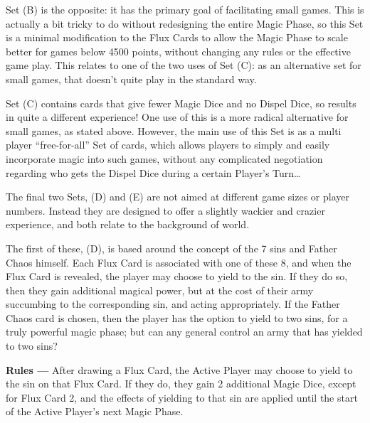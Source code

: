 
Set (B) is the opposite: it has the primary goal of facilitating small games. This is actually a bit tricky to do without redesigning the entire Magic Phase, so this Set is a minimal modification to the Flux Cards to allow the Magic Phase to scale better for games below 4500 points, without changing any rules or the effective game play. This relates to one of the two uses of Set (C): as an alternative set for small games, that doesn't quite play in the standard way.


Set (C) contains cards that give fewer Magic Dice and no Dispel Dice, so results in quite a different experience! One use of this is a more radical alternative for small games, as stated above. However, the main use of this Set is as a multi player \enquote{free-for-all} Set of cards, which allows players to simply and easily incorporate magic into such games, without any complicated negotiation regarding who gets the Dispel Dice during a certain Player's Turn\dots{}


The final two Sets, (D) and (E) are not aimed at different game sizes or player numbers. Instead they are designed to offer a slightly wackier and crazier experience, and both relate to the background of \theninthage{} world.

The first of these, (D), is based around the concept of the 7 sins and Father Chaos himself. Each Flux Card is associated with one of these 8, and when the Flux Card is revealed, the player may choose to yield to the sin. If they do so, then they gain additional magical power, but at the cost of their army succumbing to the corresponding sin, and acting appropriately. If the Father Chaos card is chosen, then the player has the option to yield to two sins, for a truly powerful magic phase; but can any general control an army that has yielded to two sins?

\textbf{Rules ---} After drawing a Flux Card, the Active Player may choose to yield to the sin on that Flux Card. If
they do, they gain 2 additional Magic Dice, except for Flux Card 2, and the effects of yielding to that sin are
applied until the start of the Active Player's next Magic Phase.


